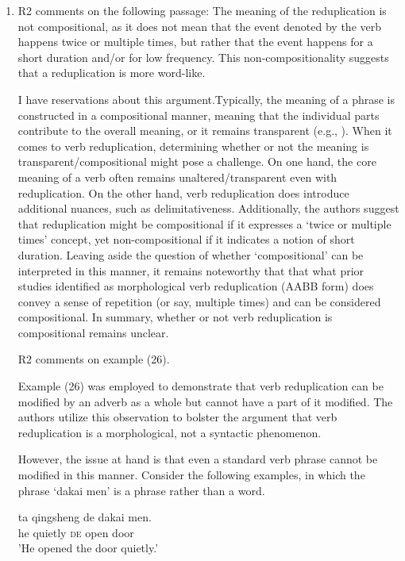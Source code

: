 \documentclass[fleqn,twoside]{article}
\begin{document}
\begin{enumerate}
\item
\begin{displayquote}
R2 comments on the following passage: The meaning of the reduplication is not compositional, as it does
not mean that the event denoted by the verb happens twice or multiple times, but
rather that the event happens for a short duration and/or for low frequency. This
non-compositionality suggests that a reduplication is more word-like.
\end{displayquote}

I have reservations about this argument.Typically, the meaning of a phrase is constructed in a compositional manner, meaning that the individual parts contribute to the overall meaning, or it remains transparent (e.g., \citealt{Schaefer2009}). When it comes to verb reduplication, determining whether or not the meaning is transparent\slash compositional might pose a challenge. On one hand, the core meaning of a verb often remains unaltered\slash transparent even with reduplication. On the other hand, verb reduplication does introduce additional nuances, such as delimitativeness. Additionally, the authors suggest that reduplication might be compositional if it expresses a `twice or multiple times' concept, yet non-compositional if it indicates a notion of short duration. Leaving aside the question of whether `compositional' can be interpreted in this manner, it remains noteworthy that that what prior studies identified as morphological verb reduplication (AABB form) does convey a sense of repetition (or say, multiple times) and can be considered compositional. In summary, whether or not verb reduplication is compositional remains unclear. 

\begin{displayquote}
R2 comments on example (26).
\end{displayquote}

Example (26) was employed to demonstrate that verb reduplication can be modified by an adverb as a whole but cannot have a part of it modified. The authors utilize this observation to bolster the argument that verb reduplication is a morphological, not a syntactic phenomenon.

However, the issue at hand is that even a standard verb phrase cannot be modified in this manner. Consider the following examples, in which the phrase `dakai men' is a phrase rather than a word.

\ea
\gll ta qingsheng de dakai men.\\
       he  quietly    \textsc{de} open door\\
\glt      'He opened the door quietly.'
\z


\end{enumerate}
\end{document}
